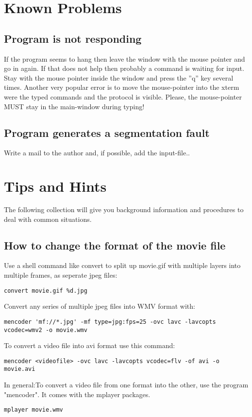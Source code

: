 \documentclass{article}
\begin{document}
\begin{appendix}
\section{\label{Known Problems}Known Problems}
\subsection{\label{Program is not responding}Program is not responding}
If the program seems to hang then leave the window with the mouse pointer and go in again. If that does not help then probably a command is waiting for input. Stay with the mouse pointer inside the window and press the ''q'' key several times. Another very popular error is to move the mouse-pointer into the xterm were the typed commands and the protocol is visible. Please, the mouse-pointer MUST stay in the main-window during typing! 

\subsection{\label{Program generates a segmentation fault}Program generates a segmentation fault}
Write a mail to the author and, if possible, add the input-file.\cite{cgx}.

\section{\label{Tips and Hints}Tips and Hints}
The following collection will give you background information and procedures to deal with common situations.

\subsection{\label{How to change the format of the movie file}How to change the format of the movie file}
Use a shell command like convert to split up movie.gif with multiple
layers into multiple frames, as seperate jpeg files:
\begin{verbatim}
convert movie.gif %d.jpg
\end{verbatim}
Convert any series of multiple jpeg files into WMV format with:
\begin{verbatim}
mencoder 'mf://*.jpg' -mf type=jpg:fps=25 -ovc lavc -lavcopts
vcodec=wmv2 -o movie.wmv
\end{verbatim}
To convert a video file into avi format use this command:
\begin{verbatim}
mencoder <videofile> -ovc lavc -lavcopts vcodec=flv -of avi -o movie.avi
\end{verbatim}
In general:To convert a video file from one format into the other, use
the program "mencoder". It comes with the mplayer packages. 
\begin{verbatim}
mplayer movie.wmv
\end{verbatim}


\end{appendix}
\end{document}
